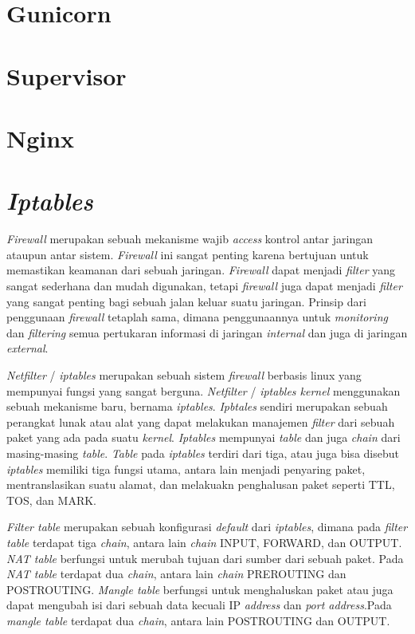 \section{Gunicorn}
 
 \section{Supervisor}
 
 \section{Nginx}
	 
 \section{\textit{Iptables}} 
 \textit{Firewall} merupakan sebuah mekanisme wajib \textit{access} kontrol antar jaringan ataupun antar sistem. \textit{Firewall} ini sangat penting karena bertujuan untuk memastikan keamanan dari sebuah jaringan. \textit{Firewall} dapat menjadi \textit{filter} yang sangat sederhana dan mudah digunakan, tetapi \textit{firewall} juga dapat menjadi \textit{filter} yang sangat penting bagi sebuah jalan keluar suatu jaringan. Prinsip dari penggunaan \textit{firewall} tetaplah sama, dimana penggunaannya untuk \textit{monitoring} dan \textit{filtering} semua pertukaran informasi di jaringan \textit{internal} dan juga di jaringan \textit{external}.
 
 \textit{Netfilter} / \textit{iptables} merupakan sebuah sistem \textit{firewall} berbasis linux yang mempunyai fungsi yang sangat berguna. \textit{Netfilter} / \textit{iptables kernel} menggunakan sebuah mekanisme baru, bernama \textit{iptables}. \textit{Ipbtales} sendiri merupakan sebuah perangkat lunak atau alat yang dapat melakukan manajemen \textit{filter} dari sebuah paket yang ada pada suatu \textit{kernel}. \textit{Iptables} mempunyai \textit{table} dan juga \textit{chain} dari masing-masing \textit{table}. \textit{Table} pada \textit{iptables} terdiri dari tiga, atau juga bisa disebut \textit{iptables} memiliki tiga fungsi utama, antara lain menjadi penyaring paket, mentranslasikan suatu alamat, dan melakuakn penghalusan paket seperti TTL, TOS, dan MARK.
 
 \textit{Filter table} merupakan sebuah konfigurasi \textit{default} dari \textit{iptables}, dimana pada \textit{filter table} terdapat tiga \textit{chain}, antara lain \textit{chain} INPUT, FORWARD, dan OUTPUT. \textit{NAT table} berfungsi untuk merubah tujuan dari sumber dari sebuah paket. Pada \textit{NAT table} terdapat dua \textit{chain}, antara lain \textit{chain} PREROUTING dan POSTROUTING. \textit{Mangle table} berfungsi untuk menghaluskan paket atau juga dapat mengubah isi dari sebuah data kecuali IP \textit{address} dan \textit{port address}.Pada \textit{mangle table} terdapat dua \textit{chain}, antara lain POSTROUTING dan OUTPUT.
	 

